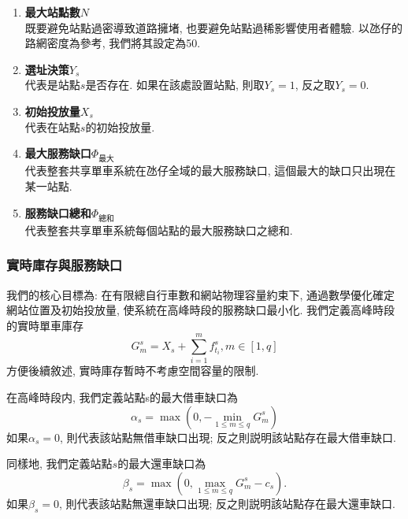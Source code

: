 \begin{enumerate}
    \item \textbf{最大站點數\(N\)}\\
    既要避免站點過密導致道路擁堵, 也要避免站點過稀影響使用者體驗. 以氹仔的路網密度為參考, 我們將其設定為50. 
    \item \textbf{選址決策\(Y_s\)}\\
    代表是站點\(s\)是否存在. 如果在該處設置站點, 則取\(Y_s=1\), 反之取\(Y_s=0\). 
    \item \textbf{初始投放量\(X_s\)}\\
    代表在站點\(s\)的初始投放量. 
    \item \textbf{最大服務缺口\(\Phi_\text{最大}\)}\\
    代表整套共享單車系統在氹仔全域的最大服務缺口, 這個最大的缺口只出現在某一站點.
    \item \textbf{服務缺口總和\(\Phi_\text{總和}\)}\\
    代表整套共享單車系統每個站點的最大服務缺口之總和.
\end{enumerate}
\subsubsection{實時庫存與服務缺口}
我們的核心目標為: 在有限總自行車數和網站物理容量約束下, 通過數學優化確定網站位置及初始投放量, 使系統在高峰時段的服務缺口最小化. 
我們定義高峰時段的實時單車庫存
\begin{equation}
G_m^s = X_s + \sum_{i=1}^m f_{t_i}^s, m\in [1,q]
\end{equation}
方便後續敘述, 實時庫存暫時不考慮空間容量的限制. 

在高峰時段内, 我們定義站點s的最大借車缺口為
\begin{equation}
    \alpha_s =\max\left(0,-\min_{1\leqslant m\leqslant q}G_{m}^{s}\right)
\end{equation}
如果\(\alpha_s=0\), 則代表該站點無借車缺口出現; 反之則説明該站點存在最大借車缺口. 

同樣地, 我們定義站點\(s\)的最大還車缺口為
\begin{equation}
    \beta_s =\max\left(0,\max_{1\leqslant m\leqslant q}G_{m}^{s}-c_s\right).
\end{equation}
如果\(\beta_s=0\), 則代表該站點無還車缺口出現; 反之則説明該站點存在最大還車缺口. 


